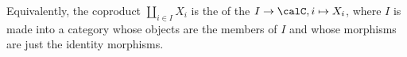 \begin{definition}
\begin{enumerate}
    Equivalently, the coproduct $\coprod_{i \in I} X_i$ is the  of the  $I \to \calC, i \mapsto X_i$, where $I$ is made into a category whose objects are the members of $I$ and whose morphisms are just the identity morphisms.
\end{enumerate}
\end{definition}